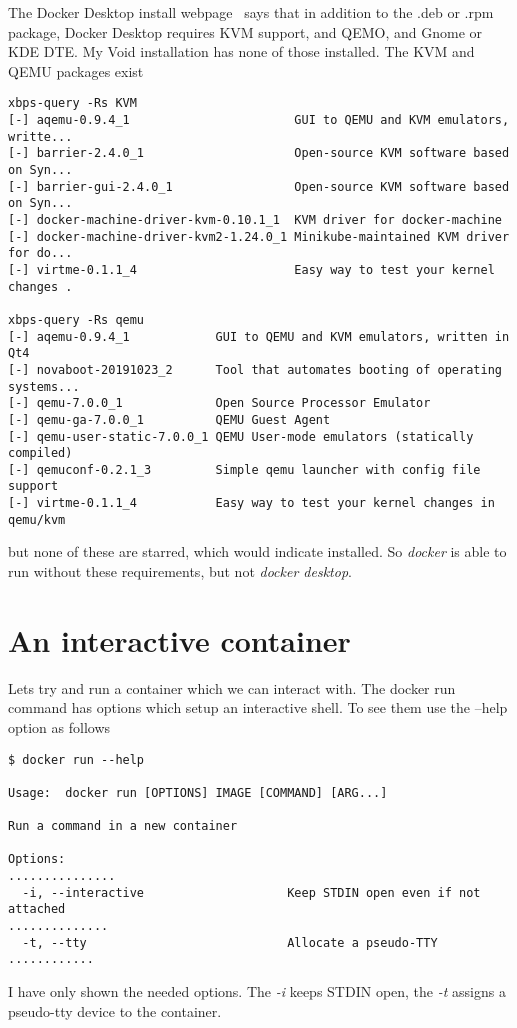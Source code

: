 \documentclass{article}  %
\begin{document}
The Docker Desktop install webpage~\cite{dock:01} says that in addition to the .deb or .rpm package, Docker Desktop requires KVM support, and QEMO, and Gnome or KDE DTE. My Void installation has none of those installed. The KVM and QEMU packages exist
\begin{verbatim}
xbps-query -Rs KVM
[-] aqemu-0.9.4_1                       GUI to QEMU and KVM emulators, writte...
[-] barrier-2.4.0_1                     Open-source KVM software based on Syn...
[-] barrier-gui-2.4.0_1                 Open-source KVM software based on Syn...
[-] docker-machine-driver-kvm-0.10.1_1  KVM driver for docker-machine
[-] docker-machine-driver-kvm2-1.24.0_1 Minikube-maintained KVM driver for do...
[-] virtme-0.1.1_4                      Easy way to test your kernel changes .

xbps-query -Rs qemu
[-] aqemu-0.9.4_1            GUI to QEMU and KVM emulators, written in Qt4
[-] novaboot-20191023_2      Tool that automates booting of operating systems...
[-] qemu-7.0.0_1             Open Source Processor Emulator
[-] qemu-ga-7.0.0_1          QEMU Guest Agent
[-] qemu-user-static-7.0.0_1 QEMU User-mode emulators (statically compiled)
[-] qemuconf-0.2.1_3         Simple qemu launcher with config file support
[-] virtme-0.1.1_4           Easy way to test your kernel changes in qemu/kvm
\end{verbatim}
but none of these are starred, which would indicate installed. 
So {\em docker} is able to run without these requirements, but not {\em docker desktop}.

\section{An interactive container}
Lets try and run a container which we can interact with. The docker run command has options which setup an interactive shell. To see them use the --help option as follows
\begin{verbatim}
$ docker run --help

Usage:  docker run [OPTIONS] IMAGE [COMMAND] [ARG...]

Run a command in a new container

Options:
...............
  -i, --interactive                    Keep STDIN open even if not attached
..............
  -t, --tty                            Allocate a pseudo-TTY
............
\end{verbatim}
I have only shown the needed options. The {\em -i} keeps STDIN open, the {\em -t} assigns a pseudo-tty device to the container.
\end{document}
